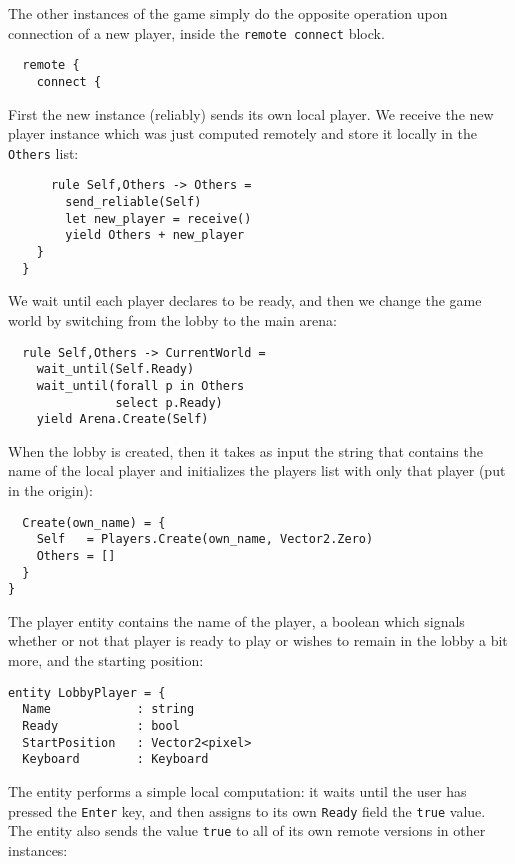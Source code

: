 The other instances of the game simply do the opposite operation upon connection of a new player, inside the \texttt{remote connect} block.

\begin{lstlisting}
  remote {
    connect {
\end{lstlisting}

First the new instance (reliably) sends its own local player. We receive the new player instance which was just computed remotely and store it locally in the \texttt{Others} list:

\begin{lstlisting}
      rule Self,Others -> Others =
        send_reliable(Self)
        let new_player = receive()
        yield Others + new_player
    }
  }
\end{lstlisting}

We wait until each player declares to be ready, and then we change the game world by switching from the lobby to the main arena:

\begin{lstlisting}
  rule Self,Others -> CurrentWorld = 
    wait_until(Self.Ready)
    wait_until(forall p in Others
               select p.Ready)
    yield Arena.Create(Self)
\end{lstlisting}

When the lobby is created, then it takes as input the string that contains the name of the local player and initializes the players list with only that player (put in the origin):

\begin{lstlisting}
  Create(own_name) = {
    Self   = Players.Create(own_name, Vector2.Zero)
    Others = []
  }
}
\end{lstlisting}

The player entity contains the name of the player, a boolean which signals whether or not that player is ready to play or wishes to remain in the lobby a bit more, and the starting position:

\begin{lstlisting}
entity LobbyPlayer = {
  Name            : string
  Ready           : bool
  StartPosition   : Vector2<pixel>
  Keyboard        : Keyboard
\end{lstlisting}

The entity performs a simple local computation: it waits until the user has pressed the \texttt{Enter} key, and then assigns to its own \texttt{Ready} field the \texttt{true} value. The entity also sends the value \texttt{true} to all of its own remote versions in other instances:

